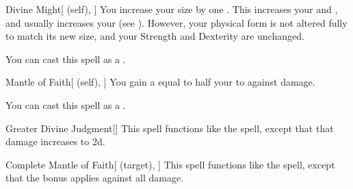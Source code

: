 \lowercase{\hypertarget{spell:Divine Might}{}}\label{spell:Divine Might}
\begin{attuneability}[\nth{3}]{\hypertarget{spell:Divine Might}{Divine Might}}[ (self), ]
You increase your size by one .
This increases your  and , and usually increases your  (see ).
However, your physical form is not altered fully to match its new size, and your Strength and Dexterity are unchanged.

You can cast this spell as a .
\end{attuneability}
\vspace{0.25em}



\lowercase{\hypertarget{spell:Mantle of Faith}{}}\label{spell:Mantle of Faith}
\begin{attuneability}[\nth{3}]{\hypertarget{spell:Mantle of Faith}{Mantle of Faith}}[ (self), ]
You gain a  equal to half your  to  against  damage.

You can cast this spell as a .
\end{attuneability}
\vspace{0.25em}



\lowercase{\hypertarget{spell:Greater Divine Judgment}{}}\label{spell:Greater Divine Judgment}
\begin{freeability}[\nth{4}]{\hypertarget{spell:Greater Divine Judgment}{Greater Divine Judgment}}[]
This spell functions like the  spell, except that that damage increases to  \plus2d.
\end{freeability}
\vspace{0.25em}



\lowercase{\hypertarget{spell:Complete Mantle of Faith}{}}\label{spell:Complete Mantle of Faith}
\begin{attuneability}[\nth{5}]{\hypertarget{spell:Complete Mantle of Faith}{Complete Mantle of Faith}}[ (target), ]
This spell functions like the  spell, except that the bonus applies against all damage.
\end{attuneability}
\vspace{0.25em}




